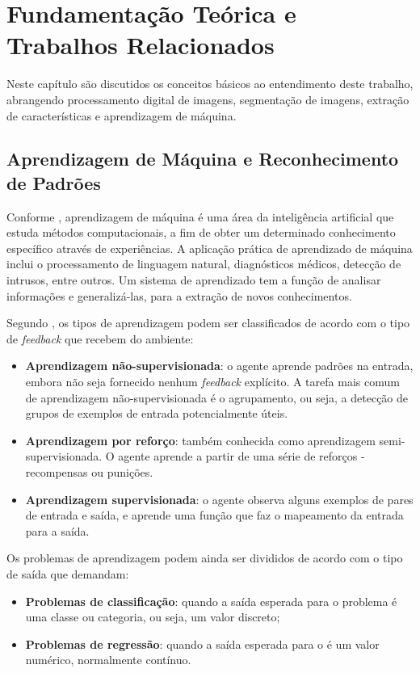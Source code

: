 \chapter{Fundamentação Teórica e Trabalhos Relacionados}

Neste capítulo são discutidos os conceitos básicos ao entendimento deste trabalho, abrangendo processamento digital de imagens, segmentação de imagens, extração de características e aprendizagem de máquina.

\section{Aprendizagem de Máquina e Reconhecimento de Padrões}

Conforme \cite{alpaydin:2010}, aprendizagem de máquina é uma área da inteligência artificial que estuda métodos computacionais, a fim de obter um determinado conhecimento específico através de experiências. A aplicação prática de aprendizado de máquina inclui o processamento de linguagem natural, diagnósticos médicos, detecção de intrusos, entre outros. Um sistema de aprendizado tem a função de analisar informações e generalizá-las, para a extração de novos conhecimentos.

Segundo \cite{russell:2010}, os tipos de aprendizagem podem ser classificados de acordo com o tipo de \textit{feedback} que recebem do ambiente:

\begin{itemize}
    \item \textbf{Aprendizagem não-supervisionada}: o agente aprende padrões na entrada, embora não seja fornecido nenhum \textit{feedback} explícito. A tarefa mais comum de aprendizagem não-supervisionada é o agrupamento, ou seja, a detecção de grupos de exemplos de entrada potencialmente úteis.
    \item \textbf{Aprendizagem por reforço}: também conhecida como aprendizagem semi-supervisionada. O agente aprende a partir de uma série de reforços - recompensas ou punições.
    \item \textbf{Aprendizagem supervisionada}: o agente observa alguns exemplos de pares de entrada e saída, e aprende uma função que faz o mapeamento da entrada para a saída. 
\end{itemize}

Os problemas de aprendizagem podem ainda ser divididos de acordo com o tipo de saída que demandam:
\begin{itemize}
	\item \textbf{Problemas de classificação}: quando a saída esperada para o problema é uma classe ou categoria, ou seja, um valor discreto;
	\item \textbf{Problemas de regressão}: quando a saída esperada para o é um valor numérico, normalmente contínuo.
\end{itemize}

